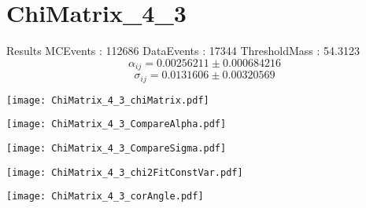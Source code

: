 \documentclass[a4paper,12pt]{article}
\begin{document}
\section{ChiMatrix\_4\_3}
\begin{minipage}{0.49\linewidth} Results \newline
MCEvents : 112686\newline
DataEvents : 17344 \newline
ThresholdMass : 54.3123\\
$$\alpha_{ij} = 0.00256211\pm 0.000684216$$
$$\sigma_{ij} = 0.0131606\pm 0.00320569$$
\end{minipage}\hfill
\begin{minipage}{0.49\linewidth} 
\texttt{[image: ChiMatrix\_4\_3\_chiMatrix.pdf]}\\
\end{minipage}
\hfill
\begin{minipage}{0.49\linewidth} 
\texttt{[image: ChiMatrix\_4\_3\_CompareAlpha.pdf]}\\
\end{minipage}
\hfill
\begin{minipage}{0.49\linewidth} 
\texttt{[image: ChiMatrix\_4\_3\_CompareSigma.pdf]}\\
\end{minipage}
\begin{minipage}{0.49\linewidth} 
\texttt{[image: ChiMatrix\_4\_3\_chi2FitConstVar.pdf]}\\
\end{minipage}
\hfill
\begin{minipage}{0.49\linewidth} 
\texttt{[image: ChiMatrix\_4\_3\_corAngle.pdf]}\\
\end{minipage}
\end{document}
